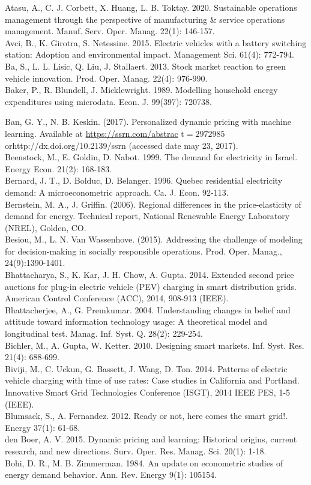 \documentclass[10pt]{article}
\begin{document}
Atasu, A., C. J. Corbett, X. Huang, L. B. Toktay. 2020. Sustainable operations management through the perspective of manufacturing \& service operations management. Manuf. Serv. Oper. Manag. 22(1): 146-157.\\
Avci, B., K. Girotra, S. Netessine. 2015. Electric vehicles with a battery switching station: Adoption and environmental impact. Management Sci. 61(4): 772-794.\\
Ba, S., L. L. Lisic, Q. Liu, J. Stallaert. 2013. Stock market reaction to green vehicle innovation. Prod. Oper. Manag. 22(4): 976-990.\\
Baker, P., R. Blundell, J. Micklewright. 1989. Modelling household energy expenditures using microdata. Econ. J. 99(397): 720738.

Ban, G. Y., N. B. Keskin. (2017). Personalized dynamic pricing with machine learning. Available at \href{https://ssrn.com/abstrac}{https://ssrn.com/abstrac} $\mathrm{t}=2972985$ orhttp://dx.doi.org/10.2139/ssrn (accessed date may 23, 2017).\\
Beenstock, M., E. Goldin, D. Nabot. 1999. The demand for electricity in Israel. Energy Econ. 21(2): 168-183.\\
Bernard, J. T., D. Bolduc, D. Belanger. 1996. Quebec residential electricity demand: A microeconometric approach. Ca. J. Econ. 92-113.\\
Bernstein, M. A., J. Griffin. (2006). Regional differences in the price-elasticity of demand for energy. Technical report, National Renewable Energy Laboratory (NREL), Golden, CO.\\
Besiou, M., L. N. Van Wassenhove. (2015). Addressing the challenge of modeling for decision-making in socially responsible operations. Prod. Oper. Manag., 24(9):1390-1401.\\
Bhattacharya, S., K. Kar, J. H. Chow, A. Gupta. 2014. Extended second price auctions for plug-in electric vehicle (PEV) charging in smart distribution grids. American Control Conference (ACC), 2014, 908-913 (IEEE).\\
Bhattacherjee, A., G. Premkumar. 2004. Understanding changes in belief and attitude toward information technology usage: A theoretical model and longitudinal test. Manag. Inf. Syst. Q. 28(2): 229-254.\\
Bichler, M., A. Gupta, W. Ketter. 2010. Designing smart markets. Inf. Syst. Res. 21(4): 688-699.\\
Biviji, M., C. Uckun, G. Bassett, J. Wang, D. Ton. 2014. Patterns of electric vehicle charging with time of use rates: Case studies in California and Portland. Innovative Smart Grid Technologies Conference (ISGT), 2014 IEEE PES, 1-5 (IEEE).\\
Blumsack, S., A. Fernandez. 2012. Ready or not, here comes the smart grid!. Energy 37(1): 61-68.\\
den Boer, A. V. 2015. Dynamic pricing and learning: Historical origins, current research, and new directions. Surv. Oper. Res. Manag. Sci. 20(1): 1-18.\\
Bohi, D. R., M. B. Zimmerman. 1984. An update on econometric studies of energy demand behavior. Ann. Rev. Energy 9(1): 105154.
\end{document}
